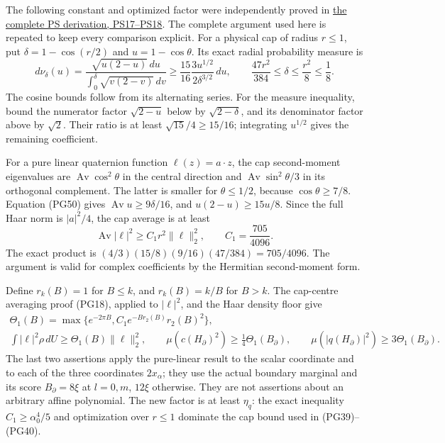 \documentclass[11pt]{article}
\begin{document}
The following constant and optimized factor were independently
proved in
\href{https://github.com/KokunoYumeto/yang-mills-interacting-workbench/blob/main/yang-mills/continuations/20261011-central-signs-shrinking-window/POLYNOMIAL_SCORE_AND_ORIGINAL_ENDPOINT.md}{the complete PS derivation, PS17–PS18}.
The complete argument used here is repeated to keep every comparison
explicit. For a physical cap of radius \(r\le1\), put
\(\delta=1-\cos(r/2)\) and \(u=1-\cos\theta\). Its exact radial
probability measure is
\[
 d\nu_\delta(u)=
 \frac{\sqrt{u(2-u)}\,du}{\int_0^\delta\sqrt{v(2-v)}\,dv}
 \ge\frac{15}{16}\frac{3u^{1/2}}{2\delta^{3/2}}\,du,
 \qquad
 \frac{47r^2}{384}\le\delta\le\frac{r^2}{8}\le\frac18 .
 \tag{PG50}
\]
The cosine bounds follow from its alternating series. For the
measure inequality, bound the numerator factor \(\sqrt{2-u}\)
below by \(\sqrt{2-\delta}\), and its denominator factor above
by \(\sqrt2\). Their ratio is at least
\(\sqrt{15}/4\ge15/16\); integrating \(u^{1/2}\) gives the
remaining coefficient.

For a pure linear quaternion function \(\ell(z)=a\cdot z\), the
cap second-moment eigenvalues are \(\operatorname{Av}\cos^2\theta\)
in the central direction and \(\operatorname{Av}\sin^2\theta/3\)
in its orthogonal complement. The latter is smaller for
\(\theta\le1/2\), because \(\cos\theta\ge7/8\).
Equation (PG50) gives \(\operatorname{Av}u\ge9\delta/16\),
and \(u(2-u)\ge15u/8\). Since the full Haar norm is
\(|a|^2/4\), the cap average is at least
\[
 \operatorname{Av}|\ell|^2
 \ge C_1r^2\|\ell\|_2^2,\qquad C_1=\frac{705}{4096}.
 \tag{PG51}
\]
The exact product is
\((4/3)(15/8)(9/16)(47/384)=705/4096\).
The argument is valid for complex coefficients by the Hermitian
second-moment form.

Define \(r_k(B)=1\) for \(B\le k\), and \(r_k(B)=k/B\)
for \(B>k\). The cap-centre averaging proof (PG18), applied
to \(|\ell|^2\), and the Haar density floor give
\[
 \begin{gathered}
 \Theta_1(B)=\max\{e^{-2\pi B},
            C_1e^{-B r_2(B)}r_2(B)^2\},\\
 \int|\ell|^2\rho\,dU\ge\Theta_1(B)\|\ell\|_2^2,\qquad
 \mu(c(H_\partial)^2)\ge\tfrac14\Theta_1(B_\partial),\qquad
 \mu(|q(H_\partial)|^2)\ge3\Theta_1(B_\partial).
 \end{gathered}\tag{PG52}
\]
The last two assertions apply the pure-linear result to the scalar
coordinate and to each of the three coordinates \(2x_\alpha\);
they use the actual boundary marginal and its score
\(B_\partial=8\xi\) at \(l=0,m\), \(12\xi\) otherwise.
They are not assertions about an arbitrary affine polynomial.
The new factor is at least \(\eta_q\): the exact inequality
\(C_1\ge\alpha_0^4/5\) and optimization over \(r\le1\)
dominate the cap bound used in (PG39)–(PG40).
\end{document}
